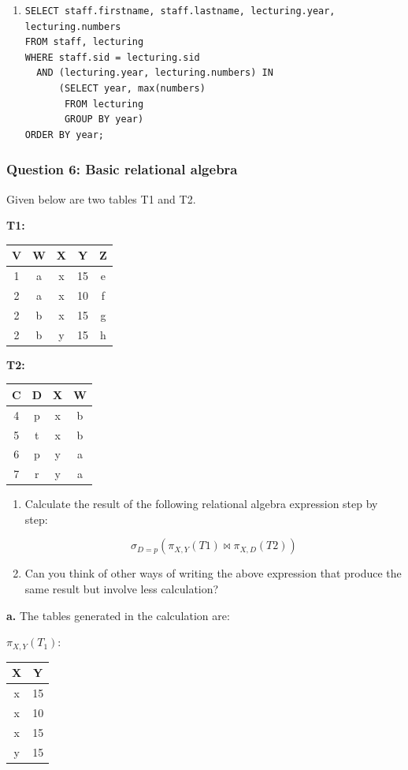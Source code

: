 \begin{enumerate}
    \item[g.]
\begin{lstlisting}
SELECT staff.firstname, staff.lastname, lecturing.year, lecturing.numbers
FROM staff, lecturing
WHERE staff.sid = lecturing.sid
  AND (lecturing.year, lecturing.numbers) IN
      (SELECT year, max(numbers)
       FROM lecturing
       GROUP BY year)
ORDER BY year;
\end{lstlisting}
\end{enumerate}

\subsubsection{Question 6: Basic relational algebra}

Given below are two tables T1 and T2.

\textbf{T1:}
\begin{tabular}{ccccc}
V & W & X & Y & Z \\
\hline
1 & a & x & 15 & e \\
2 & a & x & 10 & f \\
2 & b & x & 15 & g \\
2 & b & y & 15 & h \\
\end{tabular}

\textbf{T2:}
\begin{tabular}{cccc}
C & D & X & W \\
\hline
4 & p & x & b \\
5 & t & x & b \\
6 & p & y & a \\
7 & r & y & a \\
\end{tabular}

\begin{enumerate}
    \item[a.] Calculate the result of the following relational algebra expression step by step:

    \[
    \sigma_{D=p}(\pi_{X,Y} (T1) \bowtie \pi_{X,D}(T2))
    \]

    \item[b.] Can you think of other ways of writing the above expression that produce the same result but involve less calculation?
\end{enumerate}

\textbf{a.} The tables generated in the calculation are:

$\pi_{X,Y}(T_1)$:
\begin{tabular}{|c|c|}
\hline
X&Y \\
\hline
x&15 \\
x&10 \\
x&15 \\
y&15 \\
\hline
\end{tabular}

